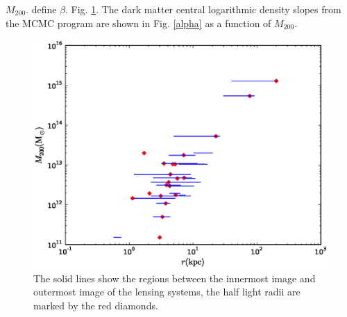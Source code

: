 \documentclass[useAMS,usenatbib]{mn2e}
\begin{document}
$M_{200}$. define $\beta$. Fig. \ref{range}. The dark matter central logarithmic density slopes from the MCMC program are shown in Fig. \ref{alpha} as a function of $M_{200}$. 

\begin{figure}
\begin{center}
\hspace{-7mm}\includegraphics[height=0.44\textwidth]{range.eps}
\caption{The solid lines show the regions between the innermost image and outermost image of the lensing systems, the half light radii are marked by the red diamonds.}
\label{range}
\end{center}
\end{figure}
\end{document}
